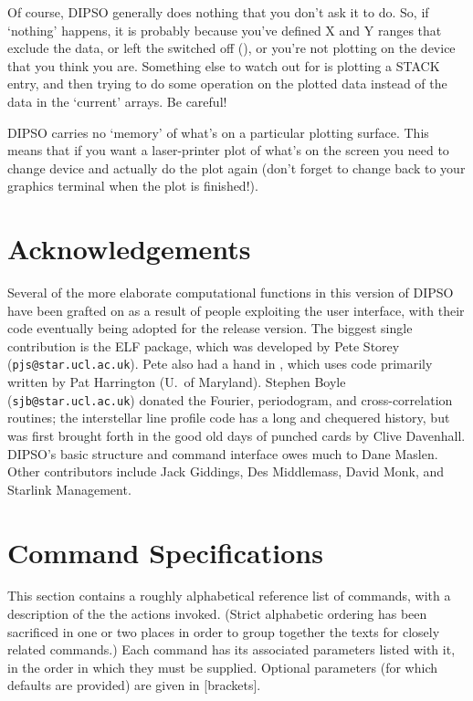 Of course, DIPSO generally does nothing that you don't ask it to do.
So, if `nothing' happens, it is probably because you've defined X and
Y ranges that exclude the data, or left the   switched off
(),  or you're not plotting on the device that you think you
are. Something else to watch out for is plotting a STACK entry, and
then trying to do some operation on the plotted data instead of the
data in the `current' arrays. Be careful!

DIPSO carries no `memory' of what's on a particular plotting surface.
This means that if you want a laser-printer plot of what's on the
screen you need to change device and actually do the plot again (don't
forget to change back to your graphics terminal when the plot is
finished!).

\section {Acknowledgements}

Several of the more elaborate computational functions in this version
of DIPSO have been grafted on as a result of people exploiting the user
interface, with their code eventually being adopted for the release
version. The biggest single contribution is the ELF package, which was
developed by Pete Storey ({\tt{pjs@star.ucl.ac.uk}}).  Pete also had a
hand in ,  which uses code primarily written by Pat Harrington
(U.\ of Maryland). Stephen Boyle ({\tt{sjb@star.ucl.ac.uk}})  donated the
Fourier, periodogram, and cross-correlation routines; the interstellar
line profile code has a long and chequered history, but was first
brought forth in the good old days of punched cards by Clive
Davenhall. DIPSO's basic structure and command interface owes much to
Dane Maslen. Other contributors include Jack Giddings, Des Middlemass,
David Monk, and Starlink Management.

\newpage
\appendix

\section {\label{APP:FULL}Command Specifications}


This section contains a roughly alphabetical reference list of commands,
with a description of the the actions invoked.
(Strict alphabetic ordering has been sacrificed in one or two places in
order to group together the texts for closely related commands.) Each
command has its associated parameters listed with it, in the order in
which they must be supplied. Optional parameters (for which defaults are
provided) are given in [brackets].

